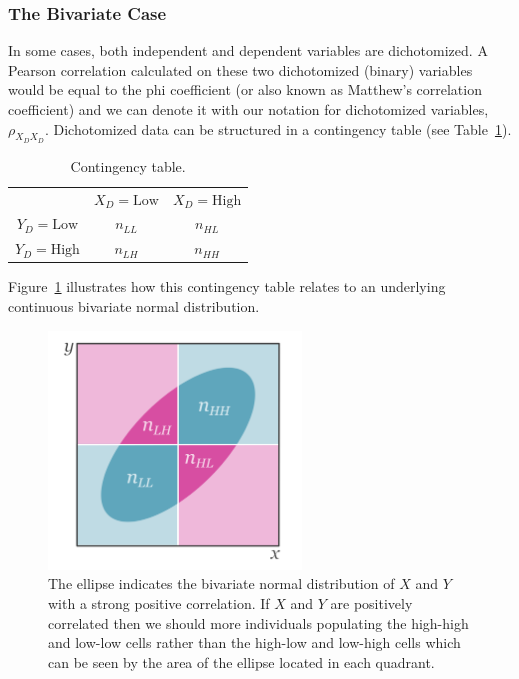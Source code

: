 \documentclass[
  letterpaper,
  DIV=11,
  numbers=noendperiod]{scrreprt}
\begin{document}
\hypertarget{the-bivariate-case}{%
\subsubsection*{The Bivariate Case}\label{the-bivariate-case}}

In some cases, both independent and dependent variables are
dichotomized. A Pearson correlation calculated on these two dichotomized
(binary) variables would be equal to the phi coefficient (or also known
as Matthew's correlation coefficient) and we can denote it with our
notation for dichotomized variables, \(\rho_{X_D X_D}\). Dichotomized
data can be structured in a contingency table (see
Table~\ref{tbl-biv-dich}).

\hypertarget{tbl-biv-dich}{}
\begin{longtable}[]{@{}ccc@{}}
\caption{\label{tbl-biv-dich}Contingency table.}\tabularnewline
\toprule\noalign{}
\endfirsthead
\endhead
\bottomrule\noalign{}
\endlastfoot
& \(X_D=\text{Low}\) & \(X_D=\text{High}\) \\
\(Y_D=\text{Low}\) & \(n_{LL}\) & \(n_{HL}\) \\
\(Y_D=\text{High}\) & \(n_{LH}\) & \(n_{HH}\) \\
\end{longtable}

Figure~\ref{fig-biv-dich} illustrates how this contingency table relates
to an underlying continuous bivariate normal distribution.

\begin{figure}[H]

{\centering \includegraphics[width=0.6\textwidth,height=\textheight]{figure/diagram-dich.png}

}

\caption{\label{fig-biv-dich}The ellipse indicates the bivariate normal
distribution of \(X\) and \(Y\) with a strong positive correlation. If
\(X\) and \(Y\) are positively correlated then we should more
individuals populating the high-high and low-low cells rather than the
high-low and low-high cells which can be seen by the area of the ellipse
located in each quadrant.}

\end{figure}
\end{document}
